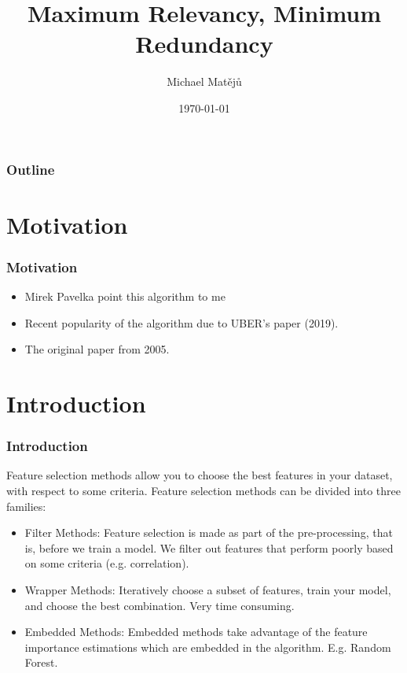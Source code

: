 \documentclass{beamer}
\title[MRMR]{Maximum Relevancy, Minimum Redundancy}
\author{Michael Mat\v{e}j\r{u}}
\institute[KB]{AI Squad}
\date{\today}
\begin{document}
    \begin{frame}
        \titlepage
    \end{frame}

    \begin{frame}
        \frametitle{Outline}
        \tableofcontents
    \end{frame}


    \section{Motivation}
    \begin{frame}
        \frametitle{Motivation}
        \begin{itemize}
            \item Mirek Pavelka point this algorithm to me
            \pause
            \item Recent popularity of the algorithm due to UBER's paper (2019).
            \pause
            \item The original paper from 2005.
        \end{itemize}
    \end{frame}


    \section{Introduction}
    \begin{frame}
        \frametitle{Introduction}
        Feature selection methods allow you to choose the best features in your dataset, with
        respect to some criteria. Feature selection methods can be divided into three families:
        \pause
        \begin{itemize}
            \item Filter Methods: Feature selection is made as part of the pre-processing, that
            is, before we train a model. We filter out features that perform poorly based on some
            criteria (e.g. correlation).
            \pause
            \item Wrapper Methods: Iteratively choose a subset of features, train your model,
            and choose the best combination. Very time consuming.
            \pause
            \item Embedded Methods: Embedded methods take advantage of the feature importance
            estimations which are embedded in the algorithm. E.g. Random Forest.
        \end{itemize}
    \end{frame}
\end{document}
